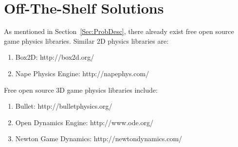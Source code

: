 \documentclass[12pt]{article}
\begin{document}
\section{Off-The-Shelf Solutions}
\label{Sec:ExistingSolns}
As mentioned in Section~\ref{Sec:ProbDesc}, there already exist free open source game physics libraries. Similar 2D physics libraries are:
\begin{enumerate}
\item{Box2D: http://box2d.org/}
\item{Nape Physics Engine: http://napephys.com/}
\end{enumerate}
Free open source 3D game physics libraries include:
\begin{enumerate}
\item{Bullet: http://bulletphysics.org/}
\item{Open Dynamics Engine: http://www.ode.org/}
\item{Newton Game Dynamics: http://newtondynamics.com/}
\end{enumerate}
\end{document}
